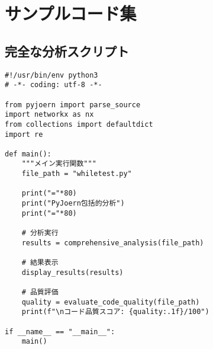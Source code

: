 \documentclass[12pt,a4paper]{article}
\begin{document}
\appendix

\section{サンプルコード集}

\subsection{完全な分析スクリプト}

\begin{lstlisting}[caption=完全な分析スクリプトの例, breaklines=true]
#!/usr/bin/env python3
# -*- coding: utf-8 -*-

from pyjoern import parse_source
import networkx as nx
from collections import defaultdict
import re

def main():
    """メイン実行関数"""
    file_path = "whiletest.py"

    print("="*80)
    print("PyJoern包括的分析")
    print("="*80)

    # 分析実行
    results = comprehensive_analysis(file_path)

    # 結果表示
    display_results(results)

    # 品質評価
    quality = evaluate_code_quality(file_path)
    print(f"\nコード品質スコア: {quality:.1f}/100")

if __name__ == "__main__":
    main()
\end{lstlisting}
\end{document}
